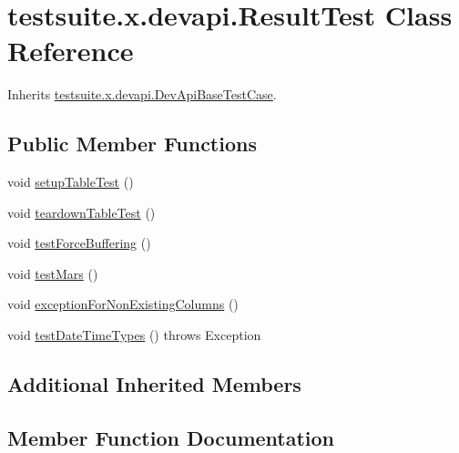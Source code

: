 \hypertarget{classtestsuite_1_1x_1_1devapi_1_1_result_test}{}\section{testsuite.\+x.\+devapi.\+Result\+Test Class Reference}
\label{classtestsuite_1_1x_1_1devapi_1_1_result_test}


Inherits \mbox{\hyperlink{classtestsuite_1_1x_1_1devapi_1_1_dev_api_base_test_case}{testsuite.\+x.\+devapi.\+Dev\+Api\+Base\+Test\+Case}}.

\subsection*{Public Member Functions}
\begin{DoxyCompactItemize}
\item 
void \mbox{\hyperlink{classtestsuite_1_1x_1_1devapi_1_1_result_test_afe3f4dd56b293428cb47e9c44db06bac}{setup\+Table\+Test}} ()
\item 
void \mbox{\hyperlink{classtestsuite_1_1x_1_1devapi_1_1_result_test_a3d15746ebf4a80d1d24d2373fcc3c632}{teardown\+Table\+Test}} ()
\item 
void \mbox{\hyperlink{classtestsuite_1_1x_1_1devapi_1_1_result_test_a822d5c48fd1c91dfd6fde563f689bb76}{test\+Force\+Buffering}} ()
\item 
void \mbox{\hyperlink{classtestsuite_1_1x_1_1devapi_1_1_result_test_aac6e53867d5be2e23aa6f43200bff7bf}{test\+Mars}} ()
\item 
void \mbox{\hyperlink{classtestsuite_1_1x_1_1devapi_1_1_result_test_a07416f1de28c45339479de6f4b7257c6}{exception\+For\+Non\+Existing\+Columns}} ()
\item 
void \mbox{\hyperlink{classtestsuite_1_1x_1_1devapi_1_1_result_test_a0575a8858d0fb560268c12a3e0de8c36}{test\+Date\+Time\+Types}} ()  throws Exception 
\end{DoxyCompactItemize}
\subsection*{Additional Inherited Members}


\subsection{Member Function Documentation}
\mbox{\label{classtestsuite_1_1x_1_1devapi_1_1_result_test_a07416f1de28c45339479de6f4b7257c6}} 
